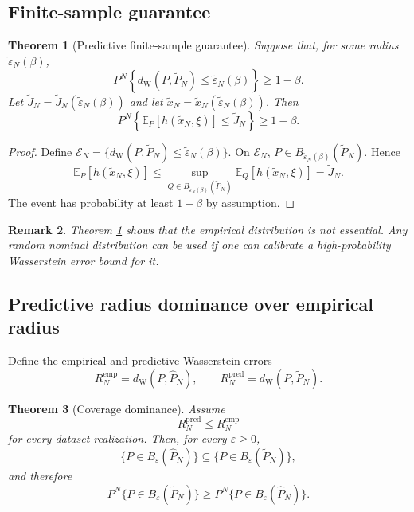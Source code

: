 \documentclass[11pt]{article}
\newtheorem{theorem}{Theorem}[section]
\newtheorem{remark}[theorem]{Remark}
\newcommand{\E}{\mathbb{E}}
\newcommand{\1}{\mathbf{1}}
\newcommand{\dW}{d_{\mathrm W}}
\newcommand{\Phat}{\widehat P_N}
\newcommand{\Ptil}{\widetilde P_N}
\newcommand{\epstilde}{\widetilde\varepsilon_N}
\begin{document}
\subsection{Finite-sample guarantee}

\begin{theorem}[Predictive finite-sample guarantee]\label{thm:pred-finite}
Suppose that, for some radius $\epstilde(\beta)$,
\begin{equation}\label{eq:pred-coverage}
    P^N\left\{\dW(P,\Ptil)\le \epstilde(\beta)\right\}\ge1-\beta.
\end{equation}
Let $\widetilde J_N=\widetilde J_N(\epstilde(\beta))$ and let $\widetilde x_N=\widetilde x_N(\epstilde(\beta))$. Then
\begin{equation}
    P^N\left\{\E_P[h(\widetilde x_N,\xi)]\le \widetilde J_N\right\}\ge1-\beta.
\end{equation}
\end{theorem}

\begin{proof}
Define $\mathcal E_N=\{\dW(P,\Ptil)\le\epstilde(\beta)\}$. On $\mathcal E_N$, $P\in B_{\epstilde(\beta)}(\Ptil)$. Hence
\begin{equation*}
\E_P[h(\widetilde x_N,\xi)]\le
\sup_{Q\in B_{\epstilde(\beta)}(\Ptil)}\E_Q[h(\widetilde x_N,\xi)]=\widetilde J_N.
\end{equation*}
The event has probability at least $1-\beta$ by assumption.
\end{proof}

\begin{remark}
Theorem \ref{thm:pred-finite} shows that the empirical distribution is not essential. Any random nominal distribution can be used if one can calibrate a high-probability Wasserstein error bound for it.
\end{remark}

\subsection{Predictive radius dominance over empirical radius}

Define the empirical and predictive Wasserstein errors
\begin{equation}
    R_N^{\mathrm{emp}}=\dW(P,\Phat),\qquad
    R_N^{\mathrm{pred}}=\dW(P,\Ptil).
\end{equation}

\begin{theorem}[Coverage dominance]\label{thm:coverage-dom}
Assume
\begin{equation}\label{eq:pred-closer-a-s}
    R_N^{\mathrm{pred}}\le R_N^{\mathrm{emp}}
\end{equation}
for every dataset realization. Then, for every $\varepsilon\ge0$,
\begin{equation}
    \{P\in B_\varepsilon(\Phat)\}\subseteq \{P\in B_\varepsilon(\Ptil)\},
\end{equation}
and therefore
\begin{equation}
    P^N\{P\in B_\varepsilon(\Ptil)\}\ge P^N\{P\in B_\varepsilon(\Phat)\}.
\end{equation}
\end{theorem}
\end{document}
